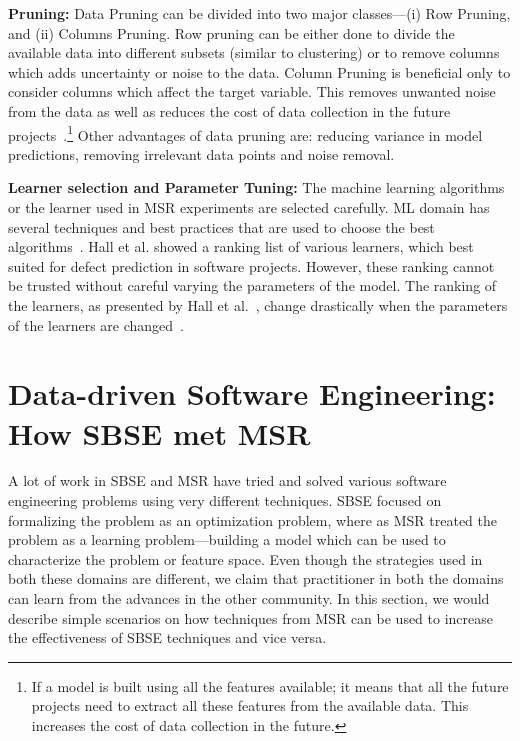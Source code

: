 \documentclass[table, xcdraw, sigconf,review, anonymous]{acmart}
\begin{document}
\noindent\textbf{Pruning: }Data Pruning can be divided into two major classes---(i) Row Pruning, and (ii) Columns Pruning. Row pruning can be either done to divide the available data into different subsets (similar to clustering) or to remove columns which adds uncertainty or noise to the data. Column Pruning is beneficial only to consider columns which affect the target variable. This removes unwanted noise from the data as well as reduces the cost of data collection in the future projects~\cite{kirsopp2003case, hall2003benchmarking, chen2005finding, gao2011choosing}.\footnote{If a model is built using all the features available; it means that all the future projects need to extract all these features from the available data. This increases the cost of data collection in the future. } Other advantages of data pruning are: reducing variance in model predictions, removing irrelevant data points and noise removal.

\noindent\textbf{Learner selection and Parameter Tuning: } The machine learning algorithms or the learner used in MSR experiments are selected carefully. ML domain has several techniques and best practices that are used to choose the best algorithms~\cite{witten2016data, malkomes2016bayesian}. Hall et al. showed a ranking list of various learners, which best suited for defect prediction in software projects. However, these ranking cannot be trusted without careful varying the parameters of the model. The ranking of the learners, as presented by Hall et al.~\cite{hall2012systematic}, change drastically when the parameters of the learners are changed~\cite{fu2016tuning, tantithamthavorn2016automated, fu2017easy}. 

\section{Data-driven Software Engineering: How SBSE met MSR}
A lot of work in SBSE and MSR have tried and solved various software engineering problems using very different techniques. SBSE focused on formalizing the problem as an optimization problem, where as MSR treated the problem as a learning problem---building a model which can be used to characterize the problem or feature space. Even though the strategies used in both these domains are different, we claim that practitioner in both the domains can learn from the advances in the other community. In this section, we would describe simple scenarios on how techniques from MSR can be used to increase the effectiveness of SBSE techniques and vice versa. 
\end{document}
